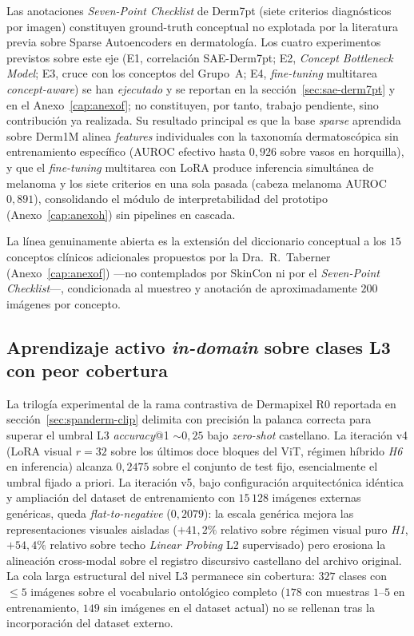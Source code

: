 Las anotaciones \emph{Seven-Point Checklist} de Derm7pt (siete
criterios diagnósticos por imagen) constituyen ground-truth conceptual
no explotada por la literatura previa sobre Sparse Autoencoders en
dermatología. Los cuatro experimentos previstos sobre este eje (E1,
correlación SAE-Derm7pt; E2, \emph{Concept Bottleneck Model}; E3,
cruce con los conceptos del Grupo~A; E4, \emph{fine-tuning} multitarea
\emph{concept-aware}) se han \emph{ejecutado} y se reportan en la
sección~\ref{sec:sae-derm7pt} y en el Anexo~\ref{cap:anexof}; no
constituyen, por tanto, trabajo pendiente, sino contribución ya
realizada. Su resultado principal es que la base \emph{sparse}
aprendida sobre Derm1M alinea \emph{features} individuales con la
taxonomía dermatoscópica sin entrenamiento específico (AUROC efectivo
hasta $0{,}926$ sobre vasos en horquilla), y que el \emph{fine-tuning}
multitarea con LoRA produce inferencia simultánea de melanoma y los
siete criterios en una sola pasada (cabeza melanoma AUROC $0{,}891$),
consolidando el módulo de interpretabilidad del prototipo
(Anexo~\ref{cap:anexoh}) sin pipelines en cascada.

La línea genuinamente abierta es la extensión del diccionario
conceptual a los $15$ conceptos clínicos adicionales propuestos por la
Dra.~R.~Taberner (Anexo~\ref{cap:anexof}) ---no contemplados por
SkinCon ni por el \emph{Seven-Point Checklist}---, condicionada al
muestreo y anotación de aproximadamente $200$ imágenes por concepto.

\subsection{Aprendizaje activo \emph{in-domain} sobre clases L3
con peor cobertura}
\label{sec:linea-active-learning}

La trilogía experimental de la rama contrastiva de Dermapixel R0
reportada en
sección~\ref{sec:spanderm-clip} delimita con precisión la palanca
correcta para superar el umbral L3 \emph{accuracy}@1
$\sim 0{,}25$ bajo \emph{zero-shot} castellano. La iteración v4
($\text{LoRA}$ visual $r=32$ sobre los últimos doce bloques del
ViT, régimen híbrido \emph{H6} en inferencia) alcanza
$0{,}2475$ sobre el conjunto de test fijo, esencialmente el
umbral fijado a priori. La iteración v5, bajo configuración
arquitectónica idéntica y ampliación del dataset de
entrenamiento con $15\,128$ imágenes externas genéricas, queda
\emph{flat-to-negative} ($0{,}2079$): la escala genérica
mejora las representaciones visuales aisladas ($+41{,}2\%$
relativo sobre régimen visual puro \emph{H1}, $+54{,}4\%$
relativo sobre techo \emph{Linear Probing} L2 supervisado) pero
erosiona la alineación cross-modal sobre el registro discursivo
castellano del archivo original. La cola larga estructural del nivel L3
permanece sin cobertura: $327$ clases con $\leq 5$ imágenes sobre
el vocabulario ontológico completo ($178$ con muestras $1$--$5$ en
entrenamiento, $149$ sin imágenes en el dataset actual) no se
rellenan tras la incorporación del dataset externo.


